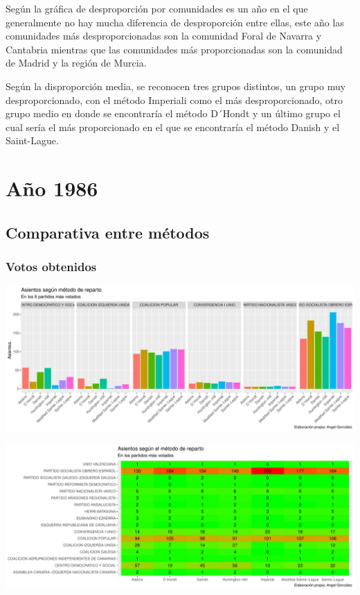 \documentclass[12pt,a4paper,]{book}
\numberwithin{dummy}{section}
\theoremstyle{ocrenumbox}
\theoremstyle{blacknumex}
\theoremstyle{blacknumbox}
\theoremstyle{ocrenum}
\theoremstyle{ocrenum}
\begin{document}
Según la gráfica de desproporción por comunidades es un año en el que
generalmente no hay mucha diferencia de desproporción entre ellas, este
año las comunidades más desproporcionadas son la comunidad Foral de
Navarra y Cantabria mientras que las comunidades más proporcionadas son
la comunidad de Madrid y la región de Murcia.

Según la disproporción media, se reconocen tres grupos distintos, un
grupo muy desproporcionado, con el método Imperiali como el más
desproporcionado, otro grupo medio en donde se encontraría el método
D´Hondt y un último grupo el cual sería el más proporcionado en el que
se encontraría el método Danish y el Saint-Lague.

\hypertarget{auxf1o-1986}{%
\section{Año 1986}\label{auxf1o-1986}}

\hypertarget{comparativa-entre-muxe9todos-3}{%
\subsection{Comparativa entre
métodos}\label{comparativa-entre-muxe9todos-3}}

\hypertarget{votos-obtenidos-3}{%
\subsubsection{Votos obtenidos}\label{votos-obtenidos-3}}

\begin{center}\includegraphics[width=0.95\linewidth]{figurasR/unnamed-chunk-86-1} \end{center}

\begin{center}\includegraphics[width=0.95\linewidth]{figurasR/unnamed-chunk-86-2} \end{center}
\end{document}

